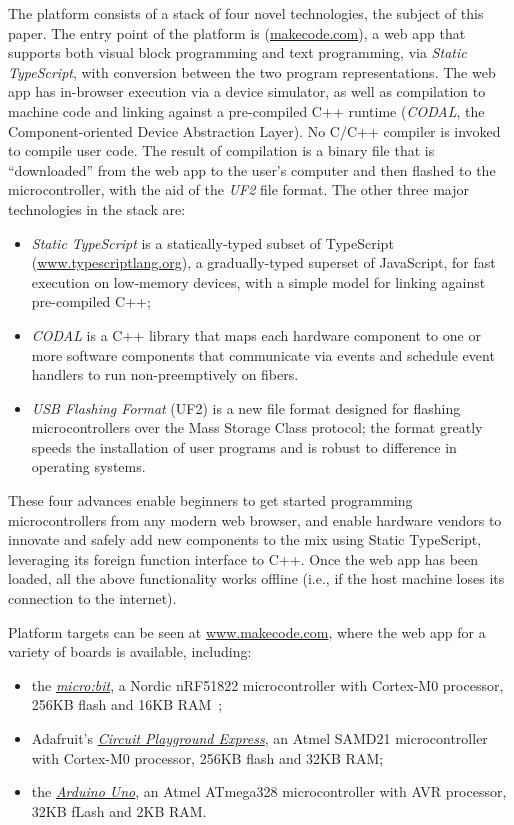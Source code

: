 The platform consists of a stack of four novel technologies, the subject of
this paper. The entry point of the platform is \emph{\MC} (\href{https://makecode.com}{makecode.com}),
a web app that supports both visual block programming and text programming,
via \emph{Static TypeScript}, with conversion 
between the two program representations. The web app has in-browser execution 
via a device simulator, as well as compilation to machine code and linking against a 
pre-compiled C++ runtime (\emph{CODAL}, the Component-oriented Device Abstraction Layer). No C/C++ compiler is invoked to compile user code. 
The result of compilation is a binary file that is ``downloaded'' from the web app to the user's 
computer and then flashed to the microcontroller, with the aid of the \emph{UF2} file format. The other three major technologies in the stack are:
\begin{itemize}

\item \emph{Static TypeScript} is a statically-typed subset of TypeScript (\url{www.typescriptlang.org}), 
a gradually-typed superset of JavaScript, for fast execution on low-memory devices, with
a simple model for linking against pre-compiled C++; 

\item \emph{CODAL} is a C++ library that maps 
each hardware component to one or more software components that communicate via events and
schedule event handlers to run non-preemptively on fibers. 

\item \emph{USB Flashing Format} (UF2) is a new file format designed for flashing microcontrollers over the Mass Storage
Class protocol; the format greatly speeds the installation of user 
programs and is robust to difference in operating systems. 
\end{itemize}
These four advances enable beginners to get started programming microcontrollers from any modern web browser, and enable
hardware vendors to innovate and safely add new components to the mix using Static TypeScript, leveraging its
foreign function interface to C++. 
Once the web app has been loaded, 
all the above functionality works offline (i.e., if the host machine loses its connection 
to the internet).

Platform targets can be seen at \url{www.makecode.com}, where the \MC web app for a variety of boards is available, 
including:
\begin{itemize}
\item the \emph{\href{https://microbit.org}{micro:bit}}, a Nordic nRF51822 microcontroller with Cortex-M0 processor, 256KB flash and 16KB RAM~\cite{microbitICSE2016};
\item Adafruit's \emph{\href{https:/adafruit.com/products/3333}{Circuit Playground Express}}, an Atmel SAMD21 microcontroller with Cortex-M0 processor, 256KB flash and 32KB RAM;
\item the \emph{\href{https://store.arduino.cc/usa/arduino-uno-rev3}{Arduino Uno}}, an Atmel ATmega328 microcontroller with AVR processor, 32KB fLash and 2KB RAM.
\end{itemize}

